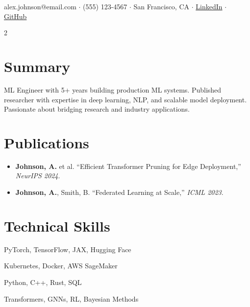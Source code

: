 \documentclass[11pt,a4paper]{article}
\begin{document}
\begin{center}
\end{center}
\vspace{-0.5em}
\begin{center}
\small alex.johnson@email.com $\cdot$ (555) 123-4567 $\cdot$ San Francisco, CA $\cdot$ \href{https://linkedin.com/in/alexjohnson}{LinkedIn} $\cdot$ \href{https://github.com/alexj}{GitHub}
\end{center}

\vspace{0.5em}

\begin{multicols}{2}
\section{Summary}
ML Engineer with 5+ years building production ML systems. Published researcher with expertise in deep learning, NLP, and scalable model deployment. Passionate about bridging research and industry applications.

\section{Publications}
\begin{itemize}[leftmargin=*,nosep,label={\color{accent}$\blacktriangleright$}]
\item \textbf{Johnson, A.} et al. ``Efficient Transformer Pruning for Edge Deployment,'' \textit{NeurIPS 2024}.
\item \textbf{Johnson, A.}, Smith, B. ``Federated Learning at Scale,'' \textit{ICML 2023}.
\end{itemize}

\columnbreak

\section{Technical Skills}
\begin{description}[style=nextline,font=\sffamily\color{accent},nosep]
\item[ML/DL] PyTorch, TensorFlow, JAX, Hugging Face
\item[Infrastructure] Kubernetes, Docker, AWS SageMaker
\item[Languages] Python, C++, Rust, SQL
\item[Methods] Transformers, GNNs, RL, Bayesian Methods
\end{description}
\end{multicols}
\end{document}
